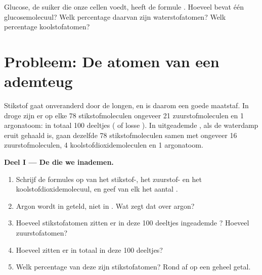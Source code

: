 \begin{exercise}[$\star\star\star$]\label{exo:g7:atoms-and-molecules:12}
Glucose, de suiker die onze cellen voedt, heeft de formule
. Hoeveel  bevat één glucosemolecuul? Welk percentage
daarvan zijn waterstofatomen? Welk percentage koolstofatomen?
\end{exercise}

\section{Probleem: De atomen van een ademteug}

\begin{problem}
\label{pb:g7:atoms-and-molecules:1}
Stikstof gaat onveranderd door de longen, en is daarom een goede
maatstaf. In droge  zijn er op elke 78 stikstofmoleculen ongeveer
21 zuurstofmoleculen en 1 argonatoom: in totaal 100 deeltjes (
of losse ). In uitgeademde , als de waterdamp eruit gehaald
is, gaan dezelfde 78 stikstofmoleculen samen met ongeveer 16
zuurstofmoleculen, 4 koolstofdioxidemoleculen en 1 argonatoom.

\medskip
\noindent\textbf{Deel I --- De  die we inademen.}
\begin{enumerate}
  \item Schrijf de formules op van het stikstof-, het zuurstof- en het
        koolstofdioxidemolecuul, en geef van elk het aantal .
  \item Argon wordt in  geteld, niet in . Wat zegt dat
        over argon?
  \item Hoeveel stikstofatomen zitten er in deze 100 deeltjes
        ingeademde ? Hoeveel zuurstofatomen?
  \item Hoeveel  zitten er in totaal in deze 100 deeltjes?
  \item Welk percentage van deze  zijn stikstofatomen? Rond af op
        een geheel getal.
\end{enumerate}


\end{problem}
